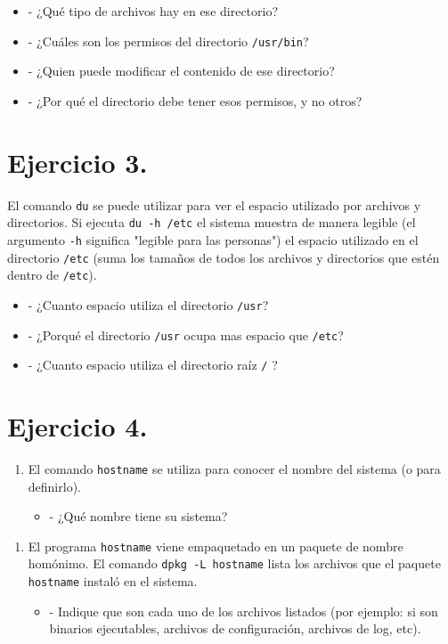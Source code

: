 \documentclass[12pt]{article}
\begin{document}
\begin{itemize}
\item - ¿Qué tipo de archivos hay en ese directorio?
\item - ¿Cuáles son los permisos del directorio \texttt{/usr/bin}?
\item - ¿Quien puede modificar el contenido de ese directorio?
\item - ¿Por qué el directorio debe tener esos permisos, y no otros?
\end{itemize}


\section{Ejercicio 3.}
El comando \texttt{du} se puede utilizar para ver el espacio utilizado por archivos y directorios.
Si ejecuta \texttt{du -h /etc} el sistema muestra de manera legible (el argumento \texttt{-h} significa "legible para las personas")
el espacio utilizado en el directorio \texttt{/etc} (suma los tamaños de todos los archivos y directorios que estén dentro de \texttt{/etc}).

\begin{itemize}
\item - ¿Cuanto espacio utiliza el directorio \texttt{/usr}?
\item - ¿Porqué el directorio \texttt{/usr} ocupa mas espacio que \texttt{/etc}?
\item - ¿Cuanto espacio utiliza el directorio raíz \texttt{/} ?
\end{itemize}


\section{Ejercicio 4.}
\begin{enumerate}
\item El comando \texttt{hostname} se utiliza para conocer el nombre del sistema (o para definirlo).
\begin{itemize}
\item - ¿Qué nombre tiene su sistema?
\end{itemize}
\end{enumerate}

\begin{enumerate}
\item El programa \texttt{hostname} viene empaquetado en un paquete de nombre homónimo.
El comando \texttt{dpkg -L hostname}  lista los archivos que el paquete \texttt{hostname} instaló en el sistema.
\begin{itemize}
\item - Indique que son cada uno de los archivos listados (por ejemplo: si son binarios ejecutables, archivos de configuración, archivos de log, etc).
\end{itemize}
\end{enumerate}
\end{document}
